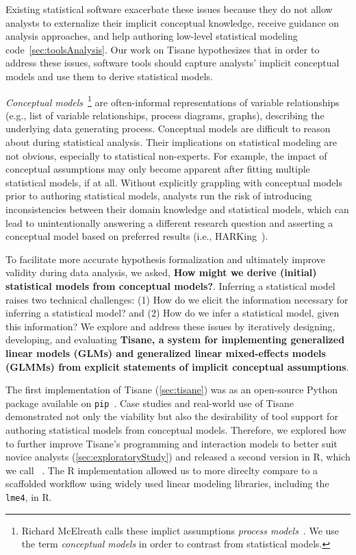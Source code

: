Existing statistical software exacerbate these issues because they do not allow
analysts to externalize their implicit conceptual knowledge, receive guidance on
analysis approaches, and help authoring low-level statistical modeling
code~\autoref{sec:toolsAnalysis}. Our work on Tisane hypothesizes that in order
to address these issues, software tools should capture analysts' implicit
conceptual models and use them to derive statistical models. 

\textit{Conceptual models}~\footnote{Richard McElreath calls these implict
assumptions \textit{process models}~\cite{mcelreath2020statistical}. We use the
term \textit{conceptual models} in order to contrast from statistical models.}
are often-informal representations of variable relationships (e.g., list of
variable relationships, process diagrams, graphs), describing the underlying
data generating process. Conceptual models are difficult to reason about during
statistical analysis. Their implications on statistical modeling are not
obvious, especially to statistical non-experts. For example, the impact of
conceptual assumptions may only become apparent after fitting multiple
statistical models, if at all. Without explicitly grappling with conceptual
models prior to authoring statistical models, analysts run the risk of
introducing inconsistencies between their domain knowledge and statistical
models, which can lead to unintentionally answering a different research
question and asserting a conceptual model based on preferred results (i.e.,
HARKing~\cite{}). 

To facilitate more accurate hypothesis formalization and ultimately improve
validity during data analysis, we asked, \textbf{How might we derive (initial)
statistical models from conceptual models?}. Inferring a statistical model
raises two technical challenges: (1) How do we elicit the information necessary
for inferring a statistical model? and (2) How do we infer a statistical model,
given this information? We explore and address these issues by iteratively
designing, developing, and evaluating \textbf{Tisane, a system for implementing
generalized linear models (GLMs) and generalized linear mixed-effects models
(GLMMs) from explicit statements of implicit conceptual assumptions}. 


The first implementation of Tisane (\autoref{sec:tisane}) was as an open-source
Python package available on \texttt{pip}~\cite{tisaneOnPip}. Case studies and
real-world use of Tisane~\cite{} demonstrated not only the viability but also
the desirability of tool support for authoring statistical models from
conceptual models. Therefore, we explored how to further improve Tisane's
programming and interaction models to better suit novice analysts
(\autoref{sec:exploratoryStudy}) and released a second version in R, which we
call \rTisane~\cite{rTisane link}. The R implementation allowed us to more
direclty compare \rTisane to a scaffolded workflow using widely used linear
modeling libraries, including the \texttt{lme4}, in R. 

